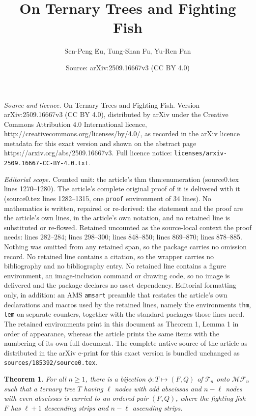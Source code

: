 \documentclass[10pt,a4paper]{amsart}
\title{On Ternary Trees and Fighting Fish}
\author{Sen-Peng Eu, Tung-Shan Fu, Yu-Ren Pan}
\date{Source: arXiv:2509.16667v3 (CC BY 4.0)}
\newtheorem{thm}{Theorem}
\newcommand{\MF}{{\mathcal{MF}}}
\newcommand{\T}{{\mathcal{T}}}
\begin{document}
\maketitle

\noindent\emph{Source and licence.} On Ternary Trees and Fighting Fish. Version arXiv:2509.16667v3 (CC BY 4.0), distributed by arXiv under the Creative Commons Attribution 4.0 International licence, http://creativecommons.org/licenses/by/4.0/, as recorded in the arXiv licence metadata for this exact version and shown on the abstract page https://arxiv.org/abs/2509.16667v3. Full licence notice: \texttt{licenses/arxiv-2509.16667-CC-BY-4.0.txt}.\par\smallskip

\noindent\textit{Editorial scope.} Counted unit: the article's thm thm:enumeration (source0.tex lines 1270--1280). The article's complete original proof of it is delivered with it (source0.tex lines 1282--1315, one \texttt{proof} environment of 34 lines). No mathematics is written, repaired or re-derived: the statement and the proof are the article's own lines, in the article's own notation, and no retained line is substituted or re-flowed.  Retained uncounted as the source-local context the proof needs: lines 282--284; lines 298--300; lines 848--850; lines 869--870; lines 878--885.  Nothing was omitted from any retained span, so the package carries no omission record.  No retained line contains a citation, so the wrapper carries no bibliography and no bibliography entry.  No retained line contains a figure environment, an image-inclusion command or drawing code, so no image is delivered and the package declares no asset dependency.  Editorial formatting only, in addition: an AMS \texttt{amsart} preamble that restates the article's own declarations and macros used by the retained lines, namely the environments \texttt{thm}, \texttt{lem} on separate counters, together with the standard packages those lines need.  The retained environments print in this document as Theorem 1, Lemma 1 in order of appearance, whereas the article prints the same items with the numbering of its own full document.  The complete native source of the article as distributed in the arXiv e-print for this exact version is bundled unchanged as \texttt{sources/185392/source0.tex}.
\begin{thm} \label{thm:TT-to-marked-fish} 
For all $n\ge 1$, there is a bijection $\phi: T\mapsto (F,Q)$ of $\T_n$ onto $\MF_n$ such that a ternary tree $T$ having $\ell$ nodes with odd abscissas and $n-\ell$ nodes with even abscissas is carried to an ordered pair $(F,Q)$, where the fighting fish $F$ has $\ell+1$ descending strips and $n-\ell$ ascending strips.
\end{thm}
\end{document}
